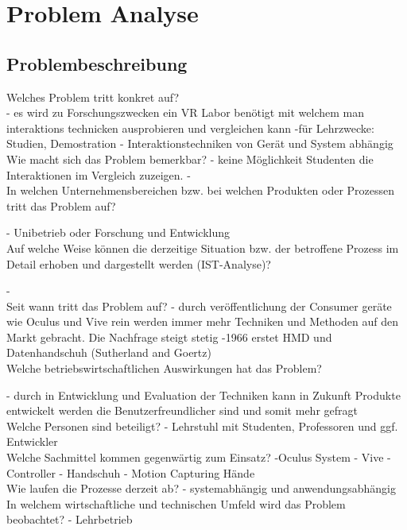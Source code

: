 \documentclass[a4paper, 12pt]{article}
\newcommand{\changefont}[3]{
\fontfamily{#1} \fontseries{#2} \fontshape{#3} \selectfont}
\begin{document}

%


	\tableofcontents
	\newpage

\section{Problem Analyse}
\subsection{Problembeschreibung}
Welches Problem tritt konkret auf? \\

- es wird zu Forschungszwecken ein VR Labor benötigt mit welchem man interaktions technicken ausprobieren und vergleichen kann
-für Lehrzwecke: Studien, Demostration 
- Interaktionstechniken von Gerät und System abhängig
\\

Wie macht sich das Problem bemerkbar? 
- keine Möglichkeit Studenten die Interaktionen im Vergleich zuzeigen.
-
\\
In welchen Unternehmensbereichen bzw. bei welchen Produkten oder Prozessen tritt das Problem auf? 

- Unibetrieb oder Forschung und Entwicklung
\\
Auf welche Weise können die derzeitige Situation bzw. der betroffene Prozess im Detail erhoben und dargestellt werden (IST-Analyse)?

-
\\
Seit wann tritt das Problem auf?
- durch veröffentlichung der Consumer geräte wie Oculus und Vive rein werden immer mehr Techniken und Methoden auf den Markt gebracht. Die Nachfrage steigt stetig
-1966 erstet HMD und Datenhandschuh (Sutherland and Goertz)
\\
Welche betriebswirtschaftlichen Auswirkungen hat das Problem? 

- durch in Entwicklung und Evaluation der Techniken kann in Zukunft Produkte entwickelt werden die Benutzerfreundlicher sind und somit mehr gefragt
\\
Welche Personen sind beteiligt? 
- Lehrstuhl  mit Studenten, Professoren und ggf. Entwickler
\\
Welche Sachmittel kommen gegenwärtig zum Einsatz? 
-Oculus System
- Vive
- Controller
- Handschuh
- Motion Capturing Hände
\\
Wie laufen die Prozesse derzeit ab? 
- systemabhängig und anwendungsabhängig
\\
In welchem wirtschaftliche und technischen Umfeld wird das Problem beobachtet?
- Lehrbetrieb
\end{document}
